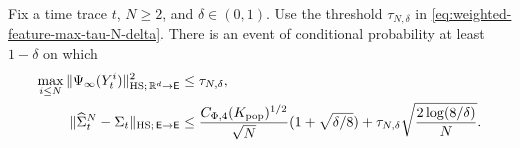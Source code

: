 \begin{lemma}
\label{lem:tilde-gamma-weighted-covariance-input}
Fix a time trace $t$, $N\ge2$, and $\delta\in(0,1)$. Use the threshold
$\tau_{N,\delta}$ in \eqref{eq:weighted-feature-max-tau-N-delta}.
There is an event of conditional probability at least $1-\delta$ on which
\begin{align}
 \max_{i\le N}\|\Psi_\infty(Y_t^i)\|_{\mathrm{HS};\,\mathbb R^d\to\mathsf E}^2&\le\tau_{N,\delta},
 \label{eq:full-covariance-sample-envelope}\\
 \|\widehat\Sigma_t^N-\Sigma_t\|_{\mathrm{HS};\,\mathsf E\to\mathsf E}
 &\le\frac{C_{\Phi,4}(K_{\rm pop})^{1/2}}{\sqrt N}
          (1+\sqrt{\delta/8})
       +\tau_{N,\delta}\sqrt{\frac{2\log(8/\delta)}N}.
 \label{eq:tilde-gamma-covariance-good-event}
\end{align}
\end{lemma}

